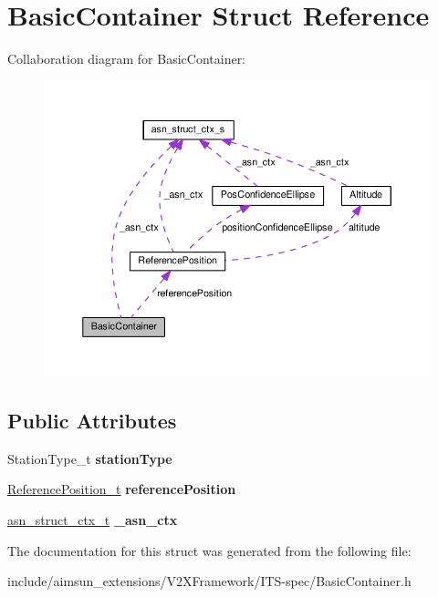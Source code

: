 \hypertarget{structBasicContainer}{}\section{Basic\+Container Struct Reference}
\label{structBasicContainer}


Collaboration diagram for Basic\+Container\+:\nopagebreak
\begin{figure}[H]
\begin{center}
\leavevmode
\includegraphics[width=350pt]{structBasicContainer__coll__graph}
\end{center}
\end{figure}
\subsection*{Public Attributes}
\begin{DoxyCompactItemize}
\item 
Station\+Type\+\_\+t {\bfseries station\+Type}\hypertarget{structBasicContainer_afc0597e3a8f70c72bca39345c3008537}{}\label{structBasicContainer_afc0597e3a8f70c72bca39345c3008537}

\item 
\hyperlink{structReferencePosition}{Reference\+Position\+\_\+t} {\bfseries reference\+Position}\hypertarget{structBasicContainer_a76c4c4810265ec06ca9866c64b5f5ba4}{}\label{structBasicContainer_a76c4c4810265ec06ca9866c64b5f5ba4}

\item 
\hyperlink{structasn__struct__ctx__s}{asn\+\_\+struct\+\_\+ctx\+\_\+t} {\bfseries \+\_\+asn\+\_\+ctx}\hypertarget{structBasicContainer_ad3ffaecb45f105d60285772e369770c4}{}\label{structBasicContainer_ad3ffaecb45f105d60285772e369770c4}

\end{DoxyCompactItemize}


The documentation for this struct was generated from the following file\+:\begin{DoxyCompactItemize}
\item 
include/aimsun\+\_\+extensions/\+V2\+X\+Framework/\+I\+T\+S-\/spec/Basic\+Container.\+h\end{DoxyCompactItemize}
